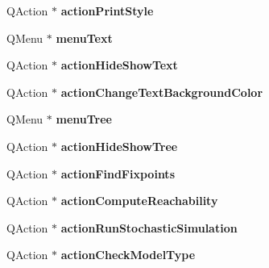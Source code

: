 \begin{DoxyCompactItemize}
\item 
\hypertarget{classMainWindow_a9f939857be21b16cab10fba41ff0e242}{Q\+Action $\ast$ {\bfseries action\+Print\+Style}}\label{classMainWindow_a9f939857be21b16cab10fba41ff0e242}

\item 
\hypertarget{classMainWindow_a606eaf5ca6bb26e0f4fdd5eb8aa84c58}{Q\+Menu $\ast$ {\bfseries menu\+Text}}\label{classMainWindow_a606eaf5ca6bb26e0f4fdd5eb8aa84c58}

\item 
\hypertarget{classMainWindow_a9b47436992df37538bc31e2d4d8ee067}{Q\+Action $\ast$ {\bfseries action\+Hide\+Show\+Text}}\label{classMainWindow_a9b47436992df37538bc31e2d4d8ee067}

\item 
\hypertarget{classMainWindow_a942f0384b4c4185504c810f5104faebc}{Q\+Action $\ast$ {\bfseries action\+Change\+Text\+Background\+Color}}\label{classMainWindow_a942f0384b4c4185504c810f5104faebc}

\item 
\hypertarget{classMainWindow_a0eebe45643eed419e08ddb8bd8da2a57}{Q\+Menu $\ast$ {\bfseries menu\+Tree}}\label{classMainWindow_a0eebe45643eed419e08ddb8bd8da2a57}

\item 
\hypertarget{classMainWindow_aca06fa2f83fb7500cc11543768067ae2}{Q\+Action $\ast$ {\bfseries action\+Hide\+Show\+Tree}}\label{classMainWindow_aca06fa2f83fb7500cc11543768067ae2}

\item 
\hypertarget{classMainWindow_a04048deb025090490f7261002a4ea4ab}{Q\+Action $\ast$ {\bfseries action\+Find\+Fixpoints}}\label{classMainWindow_a04048deb025090490f7261002a4ea4ab}

\item 
\hypertarget{classMainWindow_a2d5f7f2433aab9c8005c197bc96cdbc9}{Q\+Action $\ast$ {\bfseries action\+Compute\+Reachability}}\label{classMainWindow_a2d5f7f2433aab9c8005c197bc96cdbc9}

\item 
\hypertarget{classMainWindow_ae1ed3e80e7e9dc6e0687729e68071c37}{Q\+Action $\ast$ {\bfseries action\+Run\+Stochastic\+Simulation}}\label{classMainWindow_ae1ed3e80e7e9dc6e0687729e68071c37}

\item 
\hypertarget{classMainWindow_ab44ca117cab372eb7baea30cf0a6c8b0}{Q\+Action $\ast$ {\bfseries action\+Check\+Model\+Type}}\label{classMainWindow_ab44ca117cab372eb7baea30cf0a6c8b0}


\end{DoxyCompactItemize}
